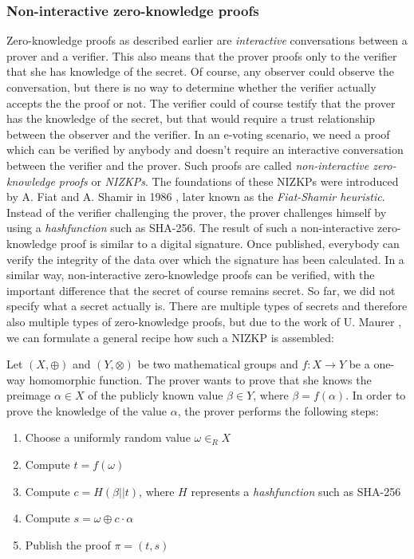 \documentclass[numbers=noenddot, abstract=on, a4paper, headsepline,
footsepline, oneside, draft=off]{scrreprt}
\begin{document}
\subsubsection{Non-interactive zero-knowledge proofs}
\label{sec:nizkp}
Zero-knowledge proofs as described earlier are \textit{interactive}
conversations between a prover and a verifier. This also means that the prover proofs only to
the verifier that she has knowledge of the secret. Of course, any observer could
observe the conversation, but there is no way to determine whether the verifier
actually accepts the the proof or not. The verifier could of course testify that
the prover has the knowledge of the secret, but that would require a trust
relationship between the observer and the verifier. In an e-voting scenario, we
need a proof which can be verified by anybody and doesn't require an interactive
conversation between the verifier and the prover. Such proofs are called
\textit{non-interactive zero-knowledge proofs} or \textit{NIZKPs}. The
foundations of these NIZKPs were introduced by A. Fiat and A. Shamir in 1986
\cite{FS87}, later known as the \textit{Fiat-Shamir heuristic}. Instead of the
verifier challenging the prover, the prover challenges himself by using a
\emph{hashfunction} such as SHA-256. The result of such a non-interactive
zero-knowledge proof is similar to a digital signature. Once published,
everybody can verify the integrity of the data over which the signature has been
calculated. In a similar way, non-interactive zero-knowledge proofs can be
verified, with the important difference that the secret of course remains
secret. So far, we did not specify what a secret actually is. There are multiple
types of secrets and therefore also multiple types of zero-knowledge proofs, but
due to the work of U. Maurer \cite{Maurer09}, we can formulate a general
recipe how such a NIZKP is assembled:

Let $(X,\oplus)$ and $(Y,\otimes)$ be two mathematical groups and
$f:X \rightarrow Y$ be a one-way homomorphic function. The prover wants to prove
that she knows the preimage $\alpha \in X$ of the publicly known value $\beta \in
Y$, where $\beta=f(\alpha)$. In order to prove the knowledge of the value
$\alpha$, the prover performs the following steps:
\begin{enumerate}
  \item Choose a uniformly random value $\omega \in_R X$
  \item Compute $t=f(\omega)$
  \item Compute $c=H(\beta||t)$, where $H$ represents a \emph{hashfunction} such
  as SHA-256
  \item Compute $s=\omega \oplus c \cdot \alpha$
  \item Publish the proof $\pi = (t,s)$
\end{enumerate}
\end{document}
